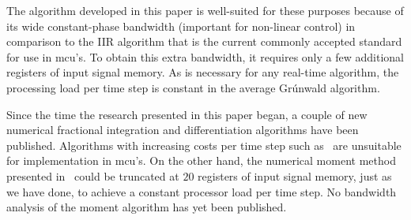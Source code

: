 The algorithm developed in this paper is well-suited for these purposes because of its wide constant-phase bandwidth (important for non-linear control) in comparison to the IIR algorithm that is the current commonly accepted standard for use in mcu's. To obtain this extra bandwidth, it requires only a few additional registers of input signal memory. As is necessary for any real-time algorithm, the processing load per time step is constant in the average Gr{\'u}nwald algorithm. 

Since the time the research presented in this paper began, a couple of new numerical fractional integration and differentiation algorithms have been published. Algorithms with increasing costs per time step such as~\cite{Fukunaga:13} are unsuitable for implementation in mcu's. On the other hand, the numerical moment method presented in~\cite{Pooseh:13} could be truncated at $20$ registers of input signal memory, just as we have done, to achieve a constant processor load per time step. No bandwidth analysis of the moment algorithm has yet been published. 